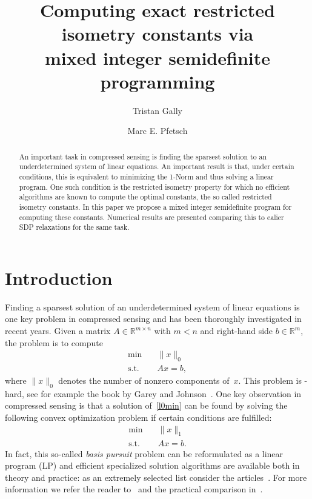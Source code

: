 \documentclass[a4paper,11pt,1p]{elsarticle}
\newcommand{\Norm}[2]{\lVert{#1}\rVert_{#2}}
\newcommand{\R}{\mathds{R}}
\newcommand{\NP}{\text{NP}}
\begin{document}
\title{Computing exact restricted isometry constants via\\ mixed integer semidefinite programming}
\author[tud]{Tristan Gally}
\author[tud]{Marc E. Pfetsch}
\address[tud]{Technische Universit\"at Darmstadt, Department of Mathematics,\\ Dolivostra\ss e 15, 64293 Darmstadt, Germany}

\begin{abstract}
An important task in compressed sensing is finding the sparsest solution to an underdetermined system of linear equations. An important result is that, under certain conditions, this is equivalent to minimizing the 1-Norm and thus
solving a linear program. One such condition is the restricted isometry property for which no efficient algorithms are known to compute the optimal constants, the so called restricted isometry constants. In this paper we propose a
mixed integer semidefinite program for computing these constants. Numerical results are presented comparing this to ealier SDP relaxations for the same task.
\end{abstract}

\maketitle

\section{Introduction}

Finding a sparsest solution of an underdetermined system of linear
equations is one key problem in compressed sensing and has been
thoroughly investigated in recent years. Given a matrix $A \in \R^{m \times n}$ with $m < n$ and 
right-hand side $b \in \R^m$, the problem is to compute
\begin{align}\label{l0min}
 \min \quad & \Norm{x}{0} \tag{$P_0$}\\
 \text{s.t.} \quad & Ax = b, \nonumber
\end{align}
where $\Norm{x}{0}$ denotes the number of nonzero components of~$x$. This
problem is \NP-hard, see for example the book by Garey and
Johnson~\cite{GareyJohnson}. One key observation in compressed sensing is
that a solution of~\eqref{l0min} can be found by solving the following
convex optimization problem if certain conditions are fulfilled:
\begin{align}\label{l1min}
 \min \quad & \Norm{x}{1} \tag{$P_1$}\\
 \text{s.t.} \quad & Ax = b. \nonumber
\end{align}
In fact, this so-called \emph{basis pursuit} problem can be reformulated as
a linear program (LP) and efficient specialized solution algorithms are
available both in theory and practice: as an extremely selected list
consider the articles~\cite{BecBC11,CheDS99,OsbPT00,vdBF08}. For more
information we refer the reader to~\cite{FouR13} and the practical
comparison in~\cite{LorPT15}.
\end{document}
